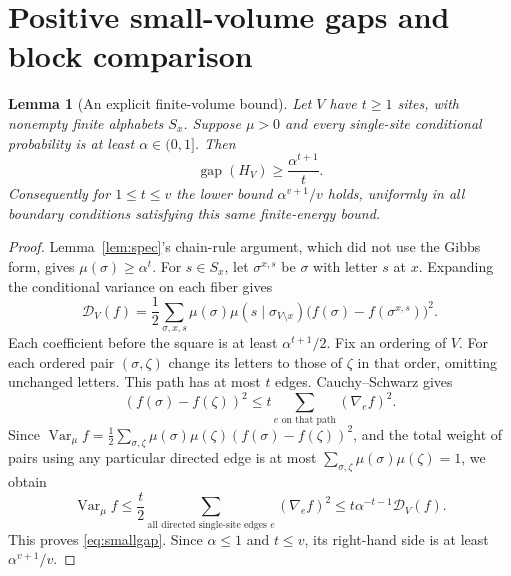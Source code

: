 \documentclass[11pt]{amsart}
\newtheorem{lemma}[theorem]{Lemma}
\theoremstyle{definition}
\newcommand{\Var}{\operatorname{Var}}
\newcommand{\gap}{\operatorname{gap}}
\newcommand{\cD}{\mathcal D}
\newcommand{\1}{\mathbf 1}
\begin{document}
\section{Positive small-volume gaps and block comparison}
\label{sec:comparison}

\begin{lemma}[An explicit finite-volume bound]
\label{lem:smallgap}
Let $V$ have $t\ge1$ sites, with nonempty finite alphabets $S_x$. Suppose
$\mu>0$ and every single-site conditional probability is at least
$\alpha\in(0,1]$. Then
\begin{equation}\label{eq:smallgap}
 \gap(H_V)\ge\frac{\alpha^{t+1}}{t}.
\end{equation}
Consequently for $1\le t\le v$ the lower bound
$\alpha^{v+1}/v$ holds, uniformly in all boundary conditions satisfying
this same finite-energy bound.
\end{lemma}
\begin{proof}
Lemma~\ref{lem:spec}'s chain-rule argument, which did not use the Gibbs
form, gives $\mu(\sigma)\ge\alpha^t$.
For $s\in S_x$, let $\sigma^{x,s}$ be $\sigma$ with letter $s$ at $x$.
Expanding the conditional variance on each fiber gives
\begin{equation}\label{eq:edgeD}
 \cD_V(f)=\frac12\sum_{\sigma,x,s}
    \mu(\sigma)\mu(s\mid\sigma_{V\setminus x})
          \bigl(f(\sigma)-f(\sigma^{x,s})\bigr)^2.
\end{equation}
Each coefficient before the square is at least $\alpha^{t+1}/2$.
Fix an ordering of $V$. For each ordered pair $(\sigma,\zeta)$ change its
letters to those of $\zeta$ in that order, omitting unchanged letters.
This path has at most $t$ edges. Cauchy--Schwarz gives
\[
 (f(\sigma)-f(\zeta))^2
 \le t\sum_{e\text{ on that path}}(\nabla_e f)^2.
\]
Since
$\Var_\mu f=\frac12\sum_{\sigma,\zeta}
\mu(\sigma)\mu(\zeta)(f(\sigma)-f(\zeta))^2$,
and the total weight of pairs using any particular directed edge is at
most $\sum_{\sigma,\zeta}\mu(\sigma)\mu(\zeta)=1$, we obtain
\[
 \Var_\mu f\le\frac t2\sum_{\text{all directed single-site edges }e}
                (\nabla_e f)^2
 \le t\alpha^{-t-1}\cD_V(f).
\]
This proves \eqref{eq:smallgap}. Since $\alpha\le1$ and $t\le v$, its
right-hand side is at least $\alpha^{v+1}/v$.
\end{proof}
\end{document}

